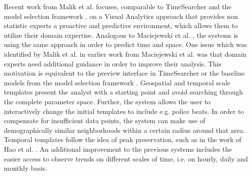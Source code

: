 \documentclass[electronic]{vgtc}             %
\begin{document}
Recent work from Malik et al. \cite{malik:2014} focuses, comparable to TimeSearcher \cite{Hochheiser:2004, buono:2007, buono:2005} and the model selection framework \cite{lu:2014}, on a Visual Analytics approach that provides non statistic experts a proactive and predictive environment, which allows them to utilize their domain expertise.
Analogous to Maciejewski et al. \cite{maciejewski:2011, maciejewski:2010}, the systems is using the same approach in order to predict time and space.
One issue which was identified by Malik et al. in earlier work from Maciejewski et al. \cite{maciejewski:2011} was that domain experts need additional guidance in order to improve their analysis.
This motivation is equivalent to the preview interface in TimeSearcher \cite{Hochheiser:2004, buono:2007, buono:2005} or the baseline models from the model selection framework \cite{lu:2014}.
Geospatial and temporal scale templates present the analyst with a starting point and avoid searching through the complete parameter space.
Further, the system allows the user to interactively change the initial templates to include e.g. police beats.
In order to compensate for insufficient data points, the system can make use of demographically similar neighborhoods within a certain radius around that area. 
Temporal templates follow the idea of peak preservation, such as in the work of Hao et al. \cite{Hao:2009, Hao:2011, Hao:2012}.
An additional improvement to the previous systems includes the easier access to observe trends on different scales of time, i.e. on hourly, daily and monthly basis.
\end{document}
